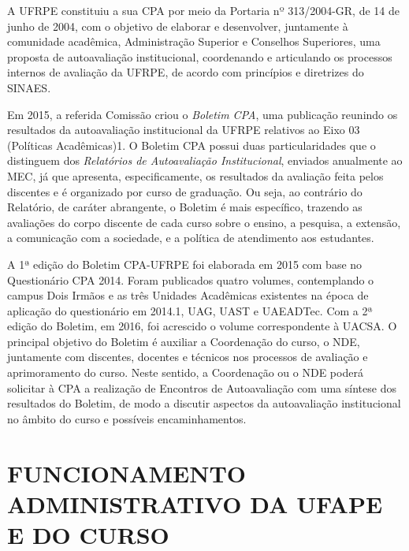 \documentclass[
	12pt,				%
	openright,			%
  oneside,     %
	a4paper,			%
	chapter=TITLE,		%
	english,			%
	french,				%
	spanish,			%
	brazil				%
	]{abntex2}
\begin{document}
A UFRPE constituiu a sua CPA por meio da Portaria nº 313/2004-GR, de 14 de junho de 2004, com o objetivo de elaborar e desenvolver, juntamente à comunidade acadêmica, Administração Superior e Conselhos Superiores, uma proposta de autoavaliação institucional, coordenando e articulando os processos internos de avaliação da UFRPE, de acordo com princípios e diretrizes do SINAES.

Em 2015, a referida Comissão criou o \textit{Boletim CPA}, uma publicação reunindo os resultados da autoavaliação institucional da UFRPE relativos ao Eixo 03 (Políticas Acadêmicas)1. O Boletim CPA possui duas particularidades que o distinguem dos \textit{Relatórios de Autoavaliação Institucional}, enviados anualmente ao MEC, já que apresenta, especificamente, os resultados da avaliação feita pelos discentes e é organizado por curso de graduação. Ou seja, ao contrário do Relatório, de caráter abrangente, o Boletim é mais específico, trazendo as avaliações do corpo discente de cada curso sobre o ensino, a pesquisa, a extensão, a comunicação com a sociedade, e a política de atendimento aos estudantes.

A 1ª edição do Boletim CPA-UFRPE foi elaborada em 2015 com base no Questionário CPA 2014. Foram publicados quatro volumes, contemplando o campus Dois Irmãos e as três Unidades Acadêmicas existentes na época de aplicação do questionário em 2014.1, UAG, UAST e UAEADTec. Com a 2ª edição do Boletim, em 2016, foi acrescido o volume correspondente à UACSA. O principal objetivo do Boletim é auxiliar a Coordenação do curso, o NDE, juntamente com discentes, docentes e técnicos nos processos de avaliação e aprimoramento do curso. Neste sentido, a Coordenação ou o NDE poderá solicitar à CPA a realização de Encontros de Autoavaliação com uma síntese dos resultados do Boletim, de modo a discutir aspectos da autoavaliação institucional no âmbito do curso e possíveis encaminhamentos.




%
%



\chapter{FUNCIONAMENTO ADMINISTRATIVO DA UFAPE E DO CURSO}
	
\end{document}
